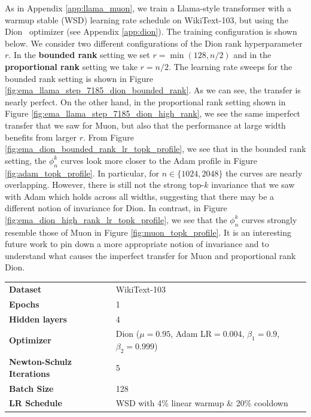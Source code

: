 \documentclass{article} %
\renewcommand{\citep}[1]{\cite{#1}}
\begin{document}
As in Appendix \ref{app:llama_muon}, we train a Llama-style transformer with a warmup stable (WSD) learning rate schedule on WikiText-103, but using the Dion~\citep{ahn2025dion} optimizer (see Appendix \ref{app:dion}). The training configuration is shown below. We consider two different configurations of the Dion rank hyperparameter $r$. In the \textbf{bounded rank} setting we set $r = \min(128, n / 2)$ and in the \textbf{proportional rank} setting we take $r = n / 2$. The learning rate sweeps for the bounded rank setting is shown in Figure \ref{fig:ema_llama_step_7185_dion_bounded_rank}. As we can see, the transfer is nearly perfect. On the other hand, in the proportional rank setting shown in Figure \ref{fig:ema_llama_step_7185_dion_high_rank}, we see the same imperfect transfer that we saw for Muon, but also that the performance at large width benefits from larger $r$. From Figure \ref{fig:ema_dion_bounded_rank_lr_topk_profile}, we see that in the bounded rank setting, the $\phi_n^k$ curves look more closer to the Adam profile in Figure \ref{fig:adam_topk_profile}. In particular, for $n \in \{1024, 2048\}$ the curves are nearly overlapping. However, there is still not the strong top-$k$ invariance that we saw with Adam which holds across all widths, suggesting that there may be a different notion of invariance for Dion. In contrast, in Figure \ref{fig:ema_dion_high_rank_lr_topk_profile}, we see that the $\phi_n^k$ curves strongly resemble those of Muon in Figure \ref{fig:muon_topk_profile}. It is an interesting future work to pin down a more appropriate notion of invariance and to understand what causes the imperfect transfer for Muon and proportional rank Dion.


\begin{table}[ht]
\centering
\small
\renewcommand{\arraystretch}{1.2}
\begin{tabular}{@{}ll@{}}
\toprule
\textbf{Dataset}       & WikiText-103                                        \\ 
\addlinespace
\textbf{Epochs}        & 1                                                   \\ 
\addlinespace
\textbf{Hidden layers} & 4                                                   \\ 
\addlinespace
\textbf{Optimizer}     & Dion ($\mu=0.95$, Adam LR$=0.004$, $\beta_1 = 0.9$, $\beta_2 = 0.999$) \\ 
\addlinespace
\textbf{Newton-Schulz Iterations} & 5 \\
\addlinespace
\textbf{Batch Size} & 128 \\
\addlinespace
\textbf{LR Schedule}   & WSD with 4\% linear warmup \& 20\% cooldown         \\ 
\bottomrule
\end{tabular}
\end{table}
\end{document}
